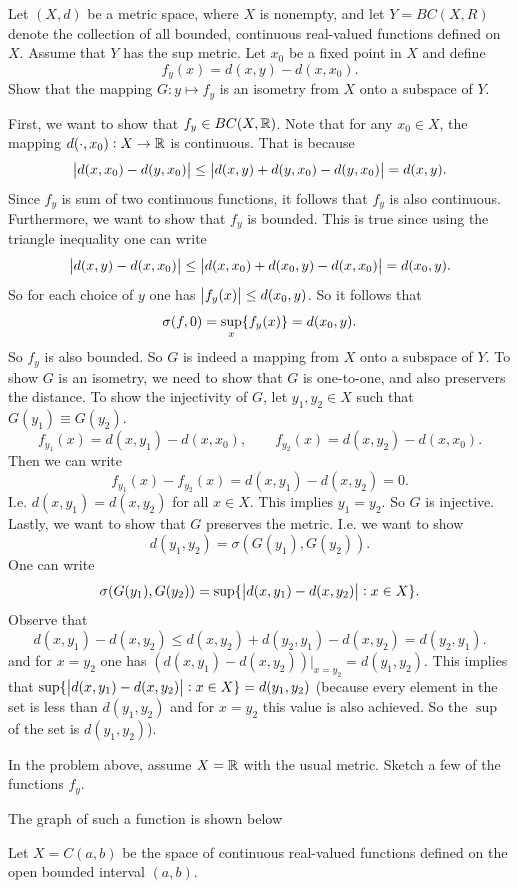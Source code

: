 \begin{problem}
	\label{prob:embeddingMetricSpaceInBanachSpace}
	Let $ (X,d) $ be a metric space, where $ X $ is nonempty, and let $ Y = BC(X,R) $
 denote the collection of all bounded, continuous real-valued functions defined on $ X $. Assume that $ Y $ has the sup metric. Let $ x_0 $ be a fixed point in $ X $ and define
 \[ f_y(x) = d(x,y) - d(x,x_0). \]
 Show that the mapping $ G:y\mapsto f_y $ is an isometry from $ X $ onto a subspace of $ Y $.
\end{problem}
\begin{solution}
	First, we want to show that $ f_y \in BC(X,\mathbb{R})  $. Note that for any $ x_0 \in X $, the mapping $ d(\cdot,x_0): X\to \mathbb{R} $ is continuous. That is because
	\[ \left|d(x,x_0) -d(y,x_0)\right| \leq \left|d(x,y) + d(y,x_0) - d(y,x_0)\right| = d(x,y). \]
	Since $ f_y $ is sum of two continuous functions, it follows that $ f_y $ is also continuous. Furthermore, we want to show that $ f_y $ is bounded. This is true since using the triangle inequality one can write
	\[ \left|d(x,y) - d(x,x_0)\right| \leq \left|d(x,x_0) + d(x_0,y) - d(x,x_0) \right| = d(x_0,y). \]
	So for each choice of $ y $ one has $ \left|f_y(x)\right| \leq d(x_0,y) $. So it follows that
	\[ \sigma(f,0) = \sup_x\{f_y(x)\} = d(x_0,y). \]
	So $ f_y $  is also bounded. So $ G $ is indeed a mapping from $ X $ onto a subspace of $ Y $. To show $ G $ is an isometry, we need to show that $ G $ is one-to-one, and also preservers the distance. To show the injectivity of $ G $, let $ y_1,y_2 \in X $ such that $ G(y_1) \equiv G(y_2) $.
	\[ f_{y_1}(x) = d(x,y_1) - d(x,x_0) ,\qquad f_{y_2}(x) = d(x,y_2)-d(x,x_0). \]
	Then we can write
	\[ f_{y_1}(x) - f_{y_2}(x) = d(x,y_1)-d(x,y_2) = 0. \]
	I.e. $ d(x,y_1) = d(x,y_2) $ for all $ x\in X $. This implies $ y_1=y_2 $.
	So $ G $ is injective. Lastly, we want to show that $ G $ preserves the metric. I.e. we want to show
	\[ d(y_1,y_2) = \sigma(G(y_1),G(y_2)). \]
	One can write 
	\[ \sigma(G(y_1),G(y_2)) = \sup\{\left|d(x,y_1)-d(x,y_2)\right|: x\in X\}. \]
	Observe that
	\[ d(x,y_1) - d(x,y_2) \leq d(x,y_2) + d(y_2,y_1) - d(x,y_2) = d(y_2,y_1). \]
	and for $ x=y_2 $ one has $ (d(x,y_1) - d(x,y_2))\big|_{x=y_2} = d(y_1,y_2) $. This implies that $ \sup\{\left|d(x,y_1)-d(x,y_2)\right|: x\in X\} = d(y_1,y_2) $ (because every element in the set is less than $ d(y_1,y_2) $ and for $ x=y_2 $ this value is also achieved. So the $ \sup $ of the set is $ d(y_1,y_2) $).
\end{solution}
 
 \begin{problem}
 	In the problem above, assume $ X=\mathbb{R} $ with the usual metric. Sketch a few of the functions $ f_y $.
 \end{problem}
 \begin{solution}
 	The graph of such a function is shown below
 	
 \end{solution}
 
 
 \begin{problem}
 	Let $ X = C(a,b) $ be the space of continuous real-valued functions defined on the open bounded interval $ (a,b) $. 
 \end{problem}
 